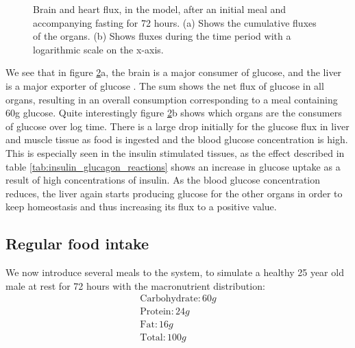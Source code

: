 \documentclass{IEEEtran}
\begin{document}
\begin{figure}[H]
\begin{subfigure}{1\columnwidth}
         \label{fig:glucose_flux_plot}
     \end{subfigure}
     \caption[short]{Brain and heart flux, in the model, after an initial meal and accompanying fasting for 72 hours. (a) Shows the cumulative fluxes of the organs. (b) Shows fluxes during the time period with a logarithmic scale on the x-axis.}
    \label{fig:glucose_flux}
\end{figure}



We see that in figure \ref{fig:glucose_flux}a, the brain is a major consumer of glucose, and the liver is a major exporter of glucose  \cite{miesfeld_mcevoy_2017}. The sum shows the net flux of glucose in all organs, resulting in an overall consumption corresponding to a meal containing 60g glucose. Quite interestingly figure \ref{fig:glucose_flux}b shows which organs are the consumers of glucose over log time. There is a large drop initially for the glucose flux in liver and muscle tissue as food is ingested and the blood glucose concentration is high. This is especially seen in the insulin stimulated tissues, as the effect described in table \ref{tab:insulin_glucagon_reactions} shows an increase in glucose uptake as a result of high concentrations of insulin. As the blood glucose concentration reduces, the liver again starts producing glucose for the other organs in order to keep homeostasis and thus increasing its flux to a positive value.


\subsection{Regular food intake}
We now introduce several meals to the system, to simulate a healthy 25 year old male at rest for 72 hours with the macronutrient distribution: \\
\begin{equation*}
\begin{split}
    \text{Carbohydrate}: 60 g \\
    \text{Protein}: 24 g \\
    \text{Fat}: 16 g \\ \hline
    \text{Total}: 100g
\end{split}
\end{equation*}
\end{document}
